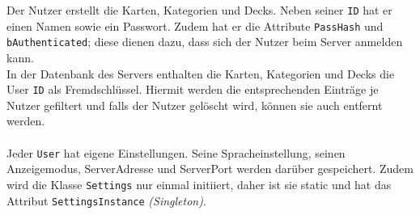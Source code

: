 \documentclass[fontsize=12pt,paper=a4,twoside]{scrartcl}
\begin{document}
Der Nutzer erstellt die Karten, Kategorien und Decks. Neben seiner \texttt{ID} hat er einen Namen sowie ein Passwort. Zudem hat er die Attribute \texttt{PassHash} und \texttt{bAuthenticated}; diese dienen dazu, dass sich der Nutzer beim Server anmelden kann. \\
In der Datenbank des Servers enthalten die Karten, Kategorien und Decks die User \texttt{ID} als Fremdschlüssel. Hiermit werden die entsprechenden Einträge je Nutzer gefiltert und falls der Nutzer gelöscht wird, können sie auch entfernt werden.\\
\\

Jeder \texttt{User} hat eigene Einstellungen. Seine Spracheinstellung, seinen Anzeigemodus, ServerAdresse und ServerPort werden darüber gespeichert.
Zudem wird die Klasse \texttt{Settings} nur einmal initiiert, daher ist sie static und hat das Attribut \texttt{SettingsInstance} \textit{(Singleton)}.

\begin{landscape}
    \thispagestyle{empty}
    
\end{landscape}
\end{document}

